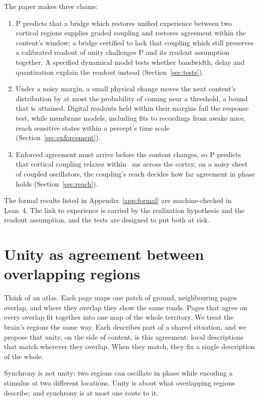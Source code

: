 \documentclass[12pt]{article}
\newcommand{\claim}[2]{\item #2 (Section~\ref{#1}).}
\begin{document}
The paper makes three claims:
\begin{enumerate}
\claim{sec:tests}{P predicts that a bridge which restores unified experience between two cortical regions supplies graded coupling and restores agreement within the content's window; a bridge certified to lack that coupling which still preserves a calibrated readout of unity challenges P and its readout assumption together. A specified dynamical model tests whether bandwidth, delay and quantization explain the readout instead}
\claim{sec:enforcement}{Under a noisy margin, a small physical change moves the next content's distribution by at most the probability of coming near a threshold, a bound that is attained. Digital readouts held within their margins fail the response test, while membrane models, including fits to recordings from awake mice, reach sensitive states within a percept's time scale}
\claim{sec:reach}{Enforced agreement must arrive before the content changes, so P predicts that cortical coupling relaxes within \ueTauFastMs{}~ms across the cortex; on a noisy sheet of coupled oscillators, the coupling's reach decides how far agreement in phase holds}
\end{enumerate}

The formal results listed in Appendix~\ref{app:formal} are machine-checked in
Lean~4. The link to experience is carried by the realization hypothesis and the
readout assumption, and the tests are designed to put both at risk.

\section{Unity as agreement between overlapping regions}
\label{sec:cover}

Think of an atlas. Each page maps one patch of ground, neighbouring pages
overlap, and where they overlap they show the same roads. Pages that agree on
every overlap fit together into one map of the whole territory. We treat the
brain's regions the same way. Each describes part of a shared situation, and
we propose that unity, on the side of content, is this agreement: local
descriptions that match wherever they overlap. When they match, they fix a
single description of the whole.

Synchrony is not unity: two regions can oscillate in phase while encoding a
stimulus at two different locations. Unity is about what overlapping regions
describe, and synchrony is at most one route to it.
\end{document}
